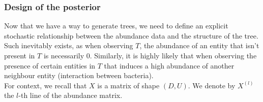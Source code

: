 \subsubsection{Design of the posterior}

Now that we have a way to generate trees, we need to define an explicit stochastic relationship between the abundance
data and the structure of the tree.
Such inevitably exists, as when observing $T$, the abundance of an entity that isn't present in $T$ is necessarily 0.
Similarly, it is highly likely that when observing the presence of certain entities in $T$ that induces a high abundance of
another neighbour entity (interaction between bacteria). \\

For context, we recall that $X$ is a matrix of shape $(D, U)$.
We denote by $X^{(l)}$ the $l$-th line of the abundance matrix.

